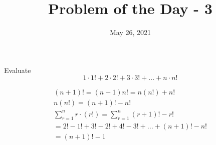 \documentclass[answers]{exam}
\title{Problem of the Day - 3}
\date{May 26, 2021}
\begin{document}
	\begin{questions}
		\question
		Evaluate \begin{equation*}1 \cdot 1! + 2 \cdot 2! + 3 \cdot 3! + ... + n \cdot n!\end{equation*}
		\begin{solution}
			\begin{gather*}
				(n+1)! = (n+1)n! = n(n!) + n! \\
				n(n!) = (n+1)! - n! \\
				\sum_{r=1}^{n} r \cdot (r!) = \sum_{r=1}^{n} (r+1)! - r! \\
				= 2! - 1! + 3! - 2! + 4! - 3! + ... + (n+1)! - n! \\
				= (n + 1)! -1
			\end{gather*}
		\end{solution}
	\end{questions}
\end{document}
